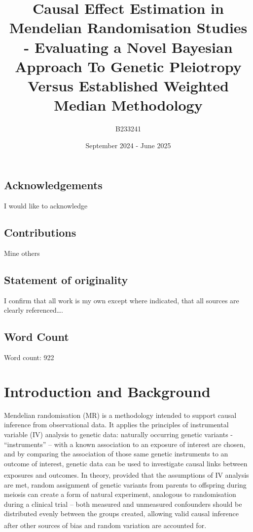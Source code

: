 \documentclass[
]{article}
\title{Causal Effect Estimation in Mendelian Randomisation Studies - Evaluating a Novel Bayesian Approach To Genetic Pleiotropy Versus Established Weighted Median Methodology}
\author{B233241}
\date{September 2024 - June 2025}
\begin{document}
\maketitle

{
\hypersetup{linkcolor=}
\setcounter{tocdepth}{2}
\tableofcontents
}
\newpage

\subsection{Acknowledgements}\label{acknowledgements}

I would like to acknowledge

\subsection{Contributions}\label{contributions}

Mine others

\subsection{Statement of originality}\label{statement-of-originality}

I confirm that all work is my own except where indicated, that all sources are clearly referenced\ldots.

\subsection{Word Count}\label{word-count}

Word count:
922

\newpage

\section{Introduction and Background}\label{introduction-and-background}

Mendelian randomisation (MR) is a methodology intended to support causal inference from observational data. It applies the principles of instrumental variable (IV) analysis to genetic data: naturally occurring genetic variants - ``instruments'' -- with a known association to an exposure of interest are chosen, and by comparing the association of those same genetic instruments to an outcome of interest, genetic data can be used to investigate causal links between exposures and outcomes\textsuperscript{}. In theory, provided that the assumptions of IV analysis are met, random assignment of genetic variants from parents to offspring during meiosis can create a form of natural experiment, analogous to randomisation during a clinical trial -- both measured and unmeasured confounders should be distributed evenly between the groups created, allowing valid causal inference after other sources of bias and random variation are accounted for\textsuperscript{}.
\end{document}
